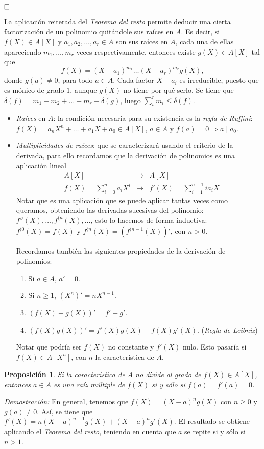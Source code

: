 \documentclass[12pt]{article}
\newtheorem{proposition}[theorem]{Proposición}
\begin{document}
$\hfill \square$

La aplicación reiterada del \textit{Teorema del resto} permite deducir una cierta factorización de un polinomio quitándole sus raíces en $A$. Es decir, si $f(X) \in A[X]$ y $a_1, a_2, \ldots, a_r \in A$ son sus raíces en $A$, cada una de ellas apareciendo $m_1, \ldots, m_r$ veces respectivamente, entonces existe $g(X) \in A[X]$ tal que $$f(X) = (X-a_1)^{m_1}\ldots (X-a_r)^{m_r}g(X),$$ donde $g(a) \neq 0$, para todo $a \in A$. Cada factor $X-a_i$ es irreducible, puesto que es mónico de grado $1$, aunque $g(X)$ no tiene por qué serlo. Se tiene que $\delta(f) = m_1+m_2 + \ldots + m_r+\delta(g)$, luego $\sum_i^r m_i \leq \delta(f)$. 
\begin{itemize}
\item \textit{Raíces} en $A$: la condición necesaria para su existencia es la \textit{regla de Ruffini}: $f(X) = a_nX^n+\ldots+ a_1X+a_0 \in A[X]$, $a \in A$ y $f(a)=0 \Rightarrow a \mid a_0$.
\item \textit{Multiplicidades de raíces}: que se caracterizará usando el criterio de la derivada, para ello recordamos que la derivación de polinomios es una aplicación lineal $$\begin{array}{rccl}
&A[X]&\longrightarrow &A[X] \\
&f(X)=\sum_{i=0}^na_iX^i& \longmapsto &f'(X) = \sum_{i=1}^{n-1} ia_iX
\end{array}
$$
Notar que es una aplicación que se puede aplicar tantas veces como queramos, obteniendo las derivadas sucesivas del polinomio: $f''(X), \ldots, f^{(n}(X), \ldots$, esto lo hacemos de forma inductiva: $f^{(0}(X)=f(X)$ y $f^{(n}(X) = (f^{(n-1}(X))'$, con $n >0$. 

Recordamos también las siguientes propiedades de la derivación de polinomios: 
\renewcommand{\theenumi}{\arabic{enumi}}
\begin{enumerate}
\item Si $a\in A$, $a' = 0$.
\item Si $n\geq 1$, $(X^n)' = nX^{n-1}.$
\item $(f(X) + g(X))' = f'+g'$.
\item $(f(X)g(X))' = f'(X)g(X) +f(X)g'(X)$. (\textit{Regla de Leibniz})
\end{enumerate}
Notar que podría ser $f(X)$ no constante y $f'(X)$ nulo. Esto pasaría si $f(X) \in A[X^n]$, con $n$ la característica de $A$. 
\end{itemize}

\begin{proposition}Si la característica de $A$ no divide al grado de $f(X) \in A[X]$, entonces $a \in A$ es una raíz múltiple de $f(X)$ si y sólo si $f(a) =f'(a)=0$.
\end{proposition}
\emph{Demostración: }En general, tenemos que $f(X) = (X-a)^ng(X)$ con $n \geq 0$ y $g(a)\neq 0$. Así, se tiene que $f'(X) = n(X-a)^{n-1}g(X)+(X-a)^ng'(X)$. El resultado se obtiene aplicando el \textit{Teorema del resto}, teniendo en cuenta que $a$ se repite si y sólo si $n >1$.
\end{document}
